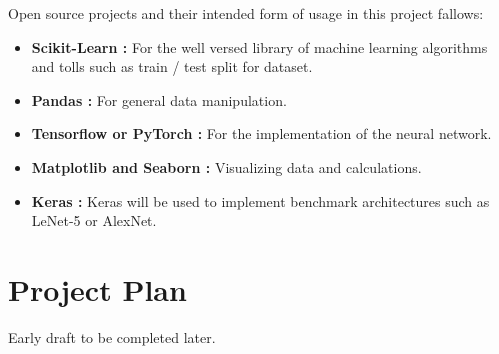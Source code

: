 \documentclass[12pt, twoside, a4paper]{article}
\begin{document}
Open source projects and their intended form of usage in this project fallows:

\begin{itemize}
    \item \textbf{Scikit-Learn \cite{scikit-learn}: }For the well versed library of machine learning algorithms and tolls such as train / test split for dataset.
    \item \textbf{Pandas \cite{pandas}: }For general data manipulation.
    \item \textbf{Tensorflow \cite{tensorflow} or PyTorch \cite{pytorch}: }For the implementation of the neural network.
    \item \textbf{Matplotlib \cite{matplotlib} and Seaborn \cite{seaborn}: }Visualizing data and calculations.
    \item \textbf{Keras \cite{keras}: }Keras will be used to implement benchmark architectures such as LeNet-5 or AlexNet.
\end{itemize}
\clearpage

\section{Project Plan}
Early draft to be completed later.
\clearpage

\printbibliography
{}
\end{document}
